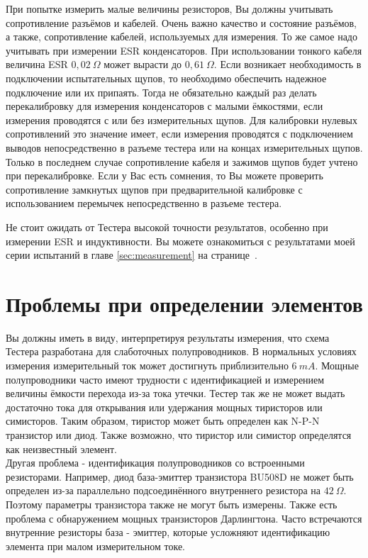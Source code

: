 При попытке измерить малые величины резисторов, Вы должны учитывать сопротивление разъёмов и кабелей. Очень важно 
качество и состояние разъёмов, а также, сопротивление кабелей, используемых для измерения. То же самое надо учитывать 
при измерении ESR конденсаторов. При использовании тонкого кабеля величина ESR \(0,02~\Omega\) может вырасти 
до \(0,61~\Omega\).
Если возникает необходимость в подключении испытательных щупов, то необходимо обеспечить надежное подключение
или их припаять. 
Тогда не обязательно каждый раз делать перекалибровку для измерения конденсаторов с малыми ёмкостями,
если измерения проводятся с или без измерительных щупов.
Для калибровки нулевых сопротивлений это значение имеет, если измерения проводятся с подключением выводов
непосредственно в разъеме тестера или на концах измерительных щупов.  
Только в последнем случае сопротивление кабеля и зажимов щупов будет учтено при перекалибровке.
Если у Вас есть сомнения, то Вы можете проверить сопротивление замкнутых щупов при предварительной
калибровке с использованием перемычек непосредственно в разъеме тестера.

Не стоит ожидать от Тестера высокой точности результатов, особенно при измерении ESR и индуктивности. Вы можете 
ознакомиться с результатами моей серии испытаний в главе \ref{sec:measurement} на странице~\pageref{sec:measurement}.

\section{Проблемы при определении элементов}
Вы должны иметь в виду, интерпретируя результаты измерения, что схема Тестера разработана для слаботочных 
полупроводников. В нормальных условиях измерения измерительный ток может достигнуть приблизительно \(6~mA\). 
Мощные полупроводники часто имеют трудности с идентификацией и измерением величины ёмкости перехода из-за тока 
утечки. Тестер так же не может выдать достаточно тока для открывания или удержания  мощных тиристоров или симисторов. 
Таким образом, тиристор может быть определен как N-P-N транзистор или диод. Также возможно, что тиристор или симистор 
определятся как неизвестный элемент.\\

Другая проблема - идентификация полупроводников со встроенными резисторами. Например, диод база-эмиттер транзистора 
BU508D не может быть определен из-за параллельно подсоединённого внутреннего  резистора на \(42~\Omega\).
Поэтому параметры транзистора также не могут быть измерены. Также есть проблема с обнаружением мощных транзисторов  
Дарлингтона. Часто встречаются внутренние резисторы база - эмиттер, которые усложняют идентификацию элемента при 
малом измерительном токе.

